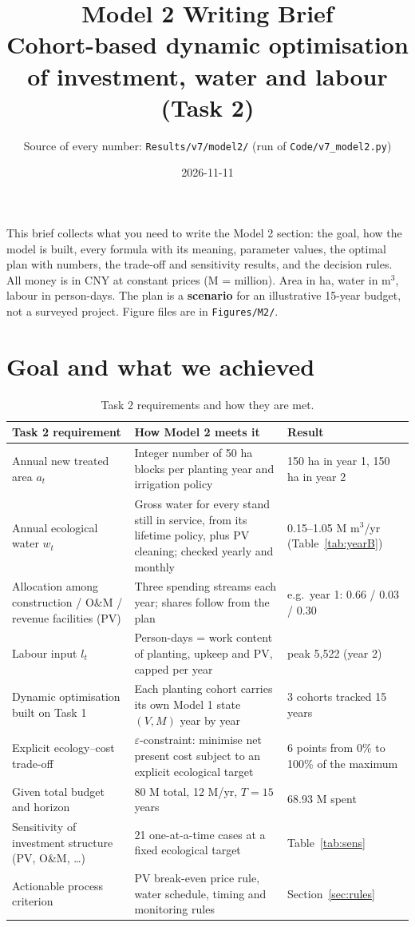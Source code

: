 \documentclass[11pt,a4paper]{article}
\title{\textbf{Model 2 Writing Brief}\\[2pt]\large Cohort-based dynamic optimisation of investment, water and labour (Task 2)}
\author{Source of every number: \texttt{Results/v7/model2/} (run of \texttt{Code/v7\_model2.py})}
\date{2026-11-11}
\begin{document}
\sloppy
\maketitle

\noindent This brief collects what you need to write the Model 2 section: the goal, how the model is
built, every formula with its meaning, parameter values, the optimal plan with numbers, the trade-off
and sensitivity results, and the decision rules. All money is in CNY at constant prices
(M = million). Area in ha, water in m$^3$, labour in person-days. The plan is a
\textbf{scenario} for an illustrative 15-year budget, not a surveyed project.
Figure files are in \texttt{Figures/M2/}.

\tableofcontents

\section{Goal and what we achieved}

\begin{table}[H]\centering\small
\begin{tabularx}{\textwidth}{@{}p{3.6cm}YY@{}}
\toprule
Task 2 requirement & How Model 2 meets it & Result \\
\midrule
Annual new treated area $a_t$ & Integer number of 50 ha blocks per planting year and irrigation policy & 150 ha in year 1, 150 ha in year 2 \\
Annual ecological water $w_t$ & Gross water for every stand still in service, from its lifetime policy, plus PV cleaning; checked yearly and monthly & 0.15--1.05 M m$^3$/yr (Table~\ref{tab:yearB}) \\
Allocation among construction / O\&M / revenue facilities (PV) & Three spending streams each year; shares follow from the plan & e.g.\ year 1: 0.66 / 0.03 / 0.30 \\
Labour input $l_t$ & Person-days = work content of planting, upkeep and PV, capped per year & peak 5,522 (year 2) \\
Dynamic optimisation built on Task 1 & Each planting cohort carries its own Model 1 state $(V,M)$ year by year & 3 cohorts tracked 15 years \\
Explicit ecology--cost trade-off & $\varepsilon$-constraint: minimise net present cost subject to an explicit ecological target & 6 points from 0\% to 100\% of the maximum \\
Given total budget and horizon & 80 M total, 12 M/yr, $T=15$ years & 68.93 M spent \\
Sensitivity of investment structure (PV, O\&M, \dots) & 21 one-at-a-time cases at a fixed ecological target & Table~\ref{tab:sens} \\
Actionable process criterion & PV break-even price rule, water schedule, timing and monitoring rules & Section~\ref{sec:rules} \\
\bottomrule
\end{tabularx}
\caption{Task 2 requirements and how they are met.}
\end{table}
\end{document}
